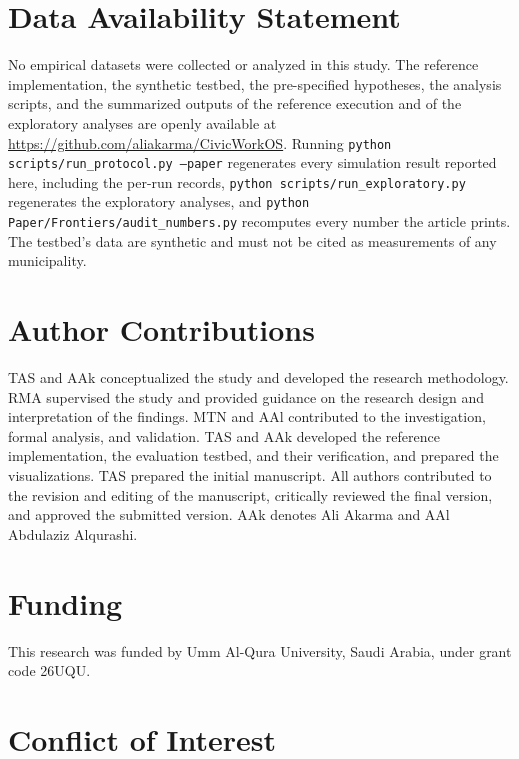 \documentclass[utf8]{FrontiersinHarvard}
\begin{document}
	\section*{Data Availability Statement}

	No empirical datasets were collected or analyzed in this study. The reference implementation, the synthetic testbed, the pre-specified hypotheses, the analysis scripts, and the summarized outputs of the reference execution and of the exploratory analyses are openly available at \url{https://github.com/aliakarma/CivicWorkOS}. Running \texttt{python scripts/run\_protocol.py --paper} regenerates every simulation result reported here, including the per-run records, \texttt{python scripts/run\_exploratory.py} regenerates the exploratory analyses, and \texttt{python Paper/Frontiers/audit\_numbers.py} recomputes every number the article prints. The testbed's data are synthetic and must not be cited as measurements of any municipality.

	\section*{Author Contributions}

	TAS and AAk conceptualized the study and developed the research methodology. RMA supervised the study and provided guidance on the research design and interpretation of the findings. MTN and AAl contributed to the investigation, formal analysis, and validation. TAS and AAk developed the reference implementation, the evaluation testbed, and their verification, and prepared the visualizations. TAS prepared the initial manuscript. All authors contributed to the revision and editing of the manuscript, critically reviewed the final version, and approved the submitted version. AAk denotes Ali Akarma and AAl Abdulaziz Alqurashi.

	\section*{Funding}

	This research was funded by Umm Al-Qura University, Saudi Arabia, under grant code 26UQU.

	\section*{Conflict of Interest}
\end{document}
